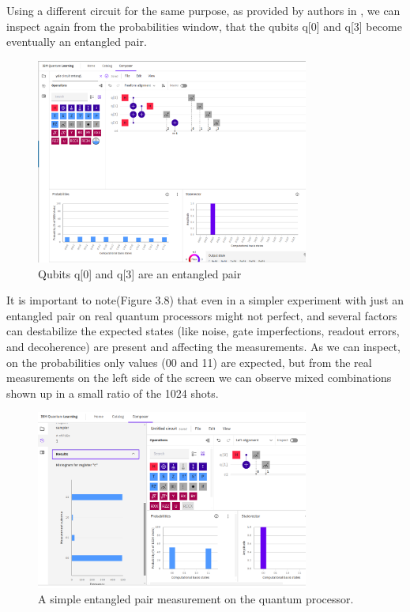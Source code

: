 		Using a different circuit for the same purpose, as provided by authors in \cite{brief-intro},
		we can inspect again from the probabilities window, that the qubits q[0] and q[3] become eventually an entangled pair.

		\begin{figure}[h!]
			\centering
			\includegraphics[width=0.8\textwidth]{ibmq/yale_circuit.png}
			\caption{Qubits q[0] and q[3] are an entangled pair}
			\label{fig:}
		\end{figure}		
	

		It is important to note(Figure 3.8) that even in a simpler experiment with just an entangled pair on real 
		quantum processors might not perfect, and several factors can destabilize the expected states 
		(like noise, gate imperfections, readout errors, and decoherence) are present and affecting the measurements.
		As we can inspect, on the probabilities only values (00 and 11) are expected, but from the real measurements 
		on the left side of the screen we can observe mixed combinations shown up in a small ratio of the 1024 shots.
		
		\begin{figure}[h!]
			\centering
			\includegraphics[width=0.8\textwidth]{ibmq/e.png}
			\caption{A simple entangled pair measurement on the quantum processor.}
			\label{fig:}
		\end{figure}		
		
